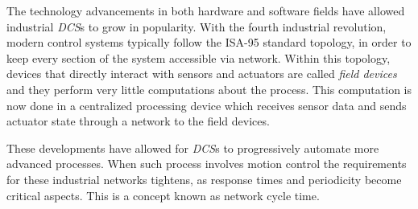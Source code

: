 The technology advancements in both hardware and software fields have allowed industrial \emph{DCS}s to grow in popularity. With the fourth industrial revolution, modern control systems typically follow the ISA-95 \cite{standard:isa95} standard topology, in order to keep every section of the system accessible via network. Within this topology, devices that directly interact with sensors and actuators are called \emph{field devices} and they perform very little computations about the process. This computation is now done in a centralized processing device which receives sensor data and sends actuator state through a network to the field devices.


These developments have allowed for \emph{DCS}s to progressively automate more advanced processes. When such process involves motion control the requirements for these industrial networks tightens, as response times and periodicity become critical aspects. This is a concept known as network cycle time.
